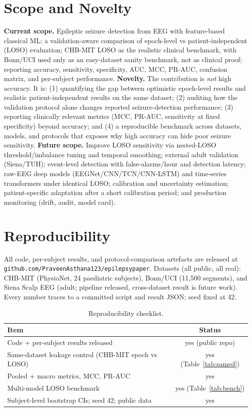 \documentclass[10pt,journal,twocolumn]{IEEEtran}
\begin{document}
\section{Scope and Novelty}
\textbf{Current scope.} Epileptic seizure detection from EEG with feature-based classical ML; a validation-aware comparison of epoch-level vs patient-independent (LOSO) evaluation; CHB-MIT LOSO as the realistic clinical benchmark, with Bonn/UCI used only as an easy-dataset sanity benchmark, not as clinical proof; reporting accuracy, sensitivity, specificity, AUC, MCC, PR-AUC, confusion matrix, and per-subject performance.
\textbf{Novelty.} The contribution is \emph{not} high accuracy. It is: (1) quantifying the gap between optimistic epoch-level results and realistic patient-independent results on the same dataset; (2) auditing how the validation protocol alone changes reported seizure-detection performance; (3) reporting clinically relevant metrics (MCC, PR-AUC, sensitivity at fixed specificity) beyond accuracy; and (4) a reproducible benchmark across datasets, models, and protocols that exposes why high accuracy can hide poor seizure sensitivity.
\textbf{Future scope.} Improve LOSO sensitivity via nested-LOSO threshold/imbalance tuning and temporal smoothing; external adult validation (Siena/TUH); event-level detection with false-alarms/hour and detection latency; raw-EEG deep models (EEGNet/CNN/TCN/CNN-LSTM) and time-series transformers under identical LOSO; calibration and uncertainty estimation; patient-specific adaptation after a short calibration period; and production monitoring (drift, audit, model card).

\section{Reproducibility}
All code, per-subject results, and protocol-comparison artefacts are released at
\texttt{github.com/PraveenAsthana123/epilepsypaper}. Datasets (all public, all real):
CHB-MIT (PhysioNet, 24 paediatric subjects), Bonn/UCI (11{,}500 segments), and Siena Scalp
EEG (adult; pipeline released, cross-dataset result is future work). Every number traces to a
committed script and result JSON; seed fixed at 42.
\begin{table}[t]\centering\caption{Reproducibility checklist.}\label{tab:repro}
\begin{tabular}{lc}\toprule
Item & Status\\\midrule
Code + per-subject results released & yes (public repo)\\
Same-dataset leakage control (CHB-MIT epoch vs LOSO) & yes (Table~\ref{tab:samed})\\
Pooled + macro metrics, MCC, PR-AUC & yes\\
Multi-model LOSO benchmark & yes (Table~\ref{tab:bench})\\
Subject-level bootstrap CIs; seed 42; public data & yes\\\bottomrule
\end{tabular}\end{table}
\end{document}
